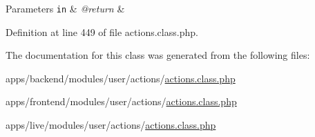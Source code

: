 \begin{DoxyParams}[1]{Parameters}
\mbox{\tt in}  & {\em @return} & \\
\hline
\end{DoxyParams}


Definition at line 449 of file actions.\-class.\-php.



The documentation for this class was generated from the following files\-:\begin{DoxyCompactItemize}
\item 
apps/backend/modules/user/actions/\hyperlink{backend_2modules_2user_2actions_2actions_8class_8php}{actions.\-class.\-php}\item 
apps/frontend/modules/user/actions/\hyperlink{frontend_2modules_2user_2actions_2actions_8class_8php}{actions.\-class.\-php}\item 
apps/live/modules/user/actions/\hyperlink{live_2modules_2user_2actions_2actions_8class_8php}{actions.\-class.\-php}\end{DoxyCompactItemize}
